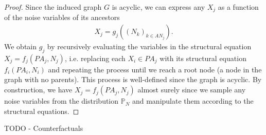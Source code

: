 \documentclass[../main.tex]{subfiles}
\begin{document}
    \begin{proof}
        Since the induced graph ${G}$ is acyclic, we can express any ${X_j}$ as a function of the noise variables of its ancestors 
        \begin{align*}
        X_j  = g_j((N_k)_{k\in AN_j}).
        \end{align*}
        We obtain ${g_j}$ by recursively evaluating the variables in the structural equation ${X_j = f_j(PA_j, N_j)}$, i.e. replacing each ${X_i\in PA_j}$ with its structural equation ${f_i(PA_i, N_i)}$ and repeating the process until we reach a root node (a node in the graph with no parents). This process is well-defined since the graph is acyclic. By construction, we have ${X_j = f_j(PA_j, N_j)}$ almost surely since we sample any noise variables from the distribution ${\mathbb{P}_N}$ and manipulate them according to the structural equations.       
    \end{proof}
    TODO - Counterfactuals
    
\end{document}
